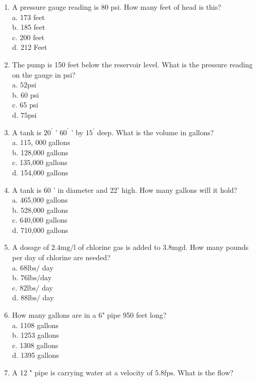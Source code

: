 \begin{enumerate}
\item A pressure gauge reading is 80 psi. How many feet of head is this?\\
a. 173 feet\\
b. 185 feet\\
c. 200 feet\\
d. 212 Feet 
\item The pump is 150 feet below the reservoir level. What is the pressure reading on the gauge in psi?\\
a. $52 \mathrm{psi}$\\
b. 60 psi\\
c. 65 psi\\
d. $75 \mathrm{psi}$\\
\item A tank is $20^{\prime}$ ' $60^{\prime}$ ' by $15^{\prime}$ deep. What is the volume in gallons?\\
a. 115, 000 gallons\\
b. 128,000 gallons\\
c. 135,000 gallons\\
d. 154,000 gallons\\
\item A tank is 60 ' in diameter and 22' high. How many gallons will it hold?\\
a. 465,000 gallons\\
b. 528,000 gallons\\
c. 640,000 gallons\\
d. 710,000 gallons\\
\item A dosage of $2.4 \mathrm{mg} / \mathrm{l}$ of chlorine gas is added to $3.8 \mathrm{mgd}$. How many pounds per day of chlorine are needed?\\
a. $68 \mathrm{lbs} /$ day\\
b. $76 \mathrm{lbs} / \mathrm{day}$\\
c. $82 \mathrm{lbs} /$ day\\
d. $88 \mathrm{lbs} /$ day\\
\item How many gallons are in a 6" pipe 950 feet long?\\
a. 1108 gallons\\
b. 1253 gallons\\
c. 1308 gallons\\
d. 1395 gallons\\
\item A 12 " pipe is carrying water at a velocity of $5.8 \mathrm{fps}$. What is the flow?\\

\end{enumerate}
